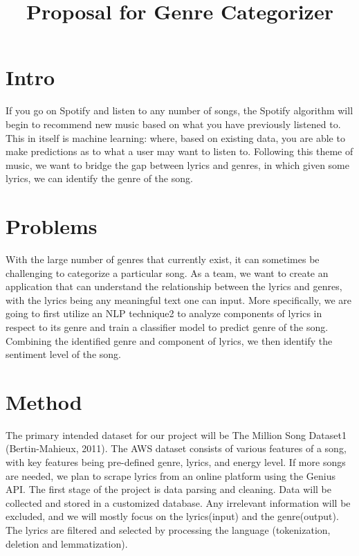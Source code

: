 \documentclass{article}
\title{Proposal for Genre Categorizer}
\begin{document}
\maketitle



\section*{Intro}
If you go on Spotify and listen to any number of songs, the Spotify algorithm will begin to recommend new music based on what you have previously listened to. This in itself is machine learning: where, based on existing data, you are able to make predictions as to what a user may want to listen to. Following this theme of music, we want to bridge the gap between lyrics and genres, in which given some lyrics, we can identify the genre of the song.

\section*{Problems}
With the large number of genres that currently exist, it can sometimes be challenging to categorize a particular song. As a team, we want to create an application that can understand the relationship between the lyrics and genres, with the lyrics being any meaningful text one can input. More specifically, we are going to first utilize an NLP technique2 to analyze components of lyrics in respect to its genre and train a classifier model to predict genre of the song. Combining the identified genre and component of lyrics, we then identify the sentiment level of the song.
\section*{Method}
The primary intended dataset for our project will be The Million Song Dataset1 (Bertin-Mahieux, 2011). The AWS dataset consists of various features of a song, with key features being pre-defined genre, lyrics, and energy level. If more songs are needed, we plan to scrape lyrics from an online platform using the Genius API. The first stage of the project is data parsing and cleaning. Data will be collected and stored in a customized database. Any irrelevant information will be excluded, and we will mostly focus on the lyrics(input) and the genre(output). The lyrics are filtered and selected by processing the language (tokenization, deletion and lemmatization).
\end{document}
